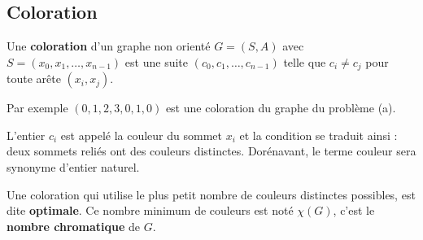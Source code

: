 \subsection{Coloration}
Une {\bf coloration} d'un graphe non orienté $G = (S, A)$ avec $S = (x_0, x_1, \ldots, x_{n-1})$ est une suite $(c_0, c_1, \ldots, c_{n-1})$ telle que $c_i \ne c_j$ pour toute arête $(x_i, x_j)$.

Par exemple $(0, 1, 2, 3, 0, 1, 0)$ est une coloration du graphe du problème (a).

L'entier $c_i$ est appelé la couleur du sommet $x_i$ et la condition se traduit ainsi : deux sommets reliés ont des couleurs distinctes. Dorénavant, le terme couleur sera synonyme d'entier naturel.

\medskip

Une coloration qui utilise le plus petit nombre de couleurs distinctes possibles, est dite {\bf optimale}. Ce nombre minimum de couleurs est noté $\chi(G)$, c'est le {\bf nombre chromatique} de $G$.

